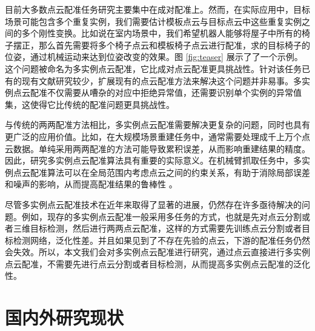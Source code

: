 目前大多数点云配准任务研究主要集中在成对配准上。然而，在实际应用中，目标场景可能包含多个重复实例，我们需要估计模板点云与目标点云中这些重复实例之间的多个刚性变换。比如说在室内场景中，我们希望机器人能够将屋子中所有的椅子摆正，那么首先需要将多个椅子点云和模板椅子点云进行配准，求的目标椅子的位姿，通过机械运动来达到位姿改变的效果。图 \ref{fig:teaser} 展示了了一个示例。这个问题被命名为多实例点云配准，它比成对点云配准更具挑战性。针对该任务已有的现有文献研究较少，扩展现有的点云配准方法来解决这个问题并非易事。多实例点云配准不仅需要从嘈杂的对应中拒绝异常值，还需要识别单个实例的异常值集，这使得它比传统的配准问题更具挑战性。

与传统的两两配准方法相比，多实例点云配准需要解决更复杂的问题，同时也具有更广泛的应用价值。比如，在大规模场景重建任务中，通常需要处理成千上万个点云数据。单纯采用两两配准的方法可能导致累积误差，从而影响重建结果的精度。因此，研究多实例点云配准算法具有重要的实际意义。在机械臂抓取任务中，多实例点云配准算法可以在全局范围内考虑点云之间的约束关系，有助于消除局部误差和噪声的影响，从而提高配准结果的鲁棒性 \cite{stuckler2012robust} 。

尽管多实例点云配准技术在近年来取得了显著的进展，仍然存在许多亟待解决的问题。例如，现存的多实例点云配准一般采用多任务的方式，也就是先对点云分割或者三维目标检测，然后进行两两点云配准，这样的方式需要先训练点云分割或者目标检测网络，泛化性差。并且如果见到了不存在先验的点云，下游的配准任务仍然会失效。所以，本文我们会对多实例点云配准进行研究，通过点云直接进行多实例点云配准，不需要先进行点云分割或者目标检测，从而提高多实例点云配准的泛化性。


\section{国内外研究现状}

